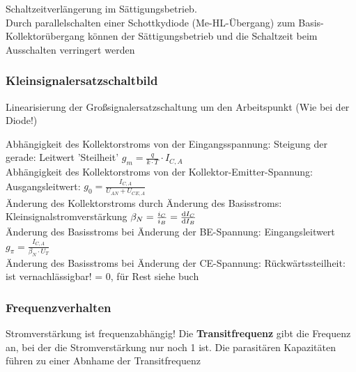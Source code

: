 \documentclass[a4paper, 12pt]{article}
\begin{document}
Schaltzeitverlängerung im Sättigungsbetrieb.\\

Durch parallelschalten einer Schottkydiode (Me-HL-Übergang) zum
Basis-Kollektorübergang können der Sättigungsbetrieb 
und die Schaltzeit beim Ausschalten verringert werden  

\subsubsection*{Kleinsignalersatzschaltbild}
Linearisierung der Großsignalersatzschaltung um den Arbeitspunkt (Wie bei der
Diode!)\\


Abhängigkeit des Kollektorstroms von der Eingangsspannung: Steigung der gerade:
Leitwert 'Steilheit' $g_m = \frac{q}{k \cdot T} \cdot I_{C,A}$\\

Abhängigkeit des Kollektorstroms von der Kollektor-Emitter-Spannung:
Ausgangsleitwert: $g_0 = \frac{I_{C,A}}{U_{AN} + U_{CE,A}}$\\

Änderung des Kollektorstroms durch Änderung des Basisstroms:
Kleinsignalstromverstärkung $\beta_N = \frac{i_C}{i_B} = \frac{\mathop{}\!\mathrm{d} I_C}{\mathop{}\!\mathrm{d}
  I_B}$\\

Änderung des Basisstroms bei Änderung der BE-Spannung: Eingangsleitwert $g_\pi =
\frac{I_{C,A}}{\beta_N \cdot U_T}$\\

Änderung des Basisstroms bei Änderung der CE-Spannung: Rückwärtssteilheit: ist
vernachlässigbar! = 0, für Rest siehe buch

\subsubsection*{Frequenzverhalten}
Stromverstärkung ist frequenzabhängig! Die \textbf{Transitfrequenz} gibt die
Frequenz an, bei der die Stromverstärkung nur noch 1 ist.
Die parasitären Kapazitäten führen zu einer Abnhame der Transitfrequenz
\end{document}
